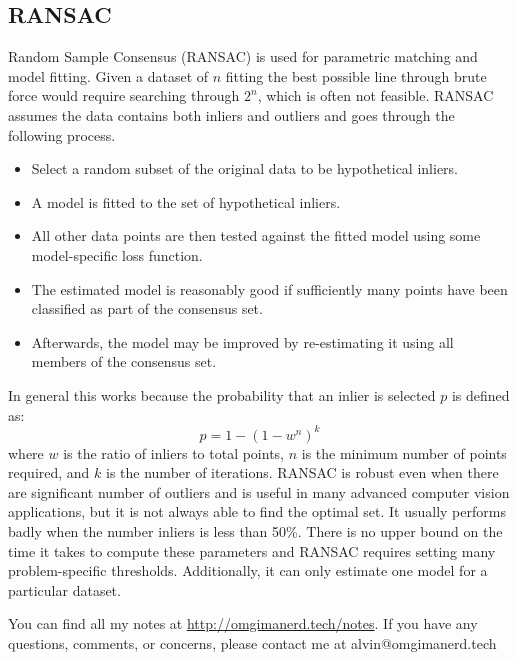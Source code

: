\documentclass{math}
\begin{document}
\subsection*{RANSAC}
Random Sample Consensus (RANSAC) is used for parametric matching and model
fitting. Given a dataset of \( n \) fitting the best possible line through
brute force would require searching through \( 2^n \), which is often not
feasible. RANSAC assumes the data contains both inliers and outliers and goes
through the following process.
\begin{itemize}
  \item Select a random subset of the original data to be hypothetical inliers.
  \item A model is fitted to the set of hypothetical inliers.
  \item All other data points are then tested against the fitted model using
    some model-specific loss function.
  \item The estimated model is reasonably good if sufficiently many points have
    been classified as part of the consensus set.
  \item Afterwards, the model may be improved by re-estimating it using all
    members of the consensus set.
\end{itemize}
In general this works because the probability that an inlier is selected \( p \)
is defined as:
\[ p = 1-(1-w^n)^k \]
where \( w \) is the ratio of inliers to total points, \( n \) is the minimum
number of points required, and \( k \) is the number of iterations. RANSAC
is robust even when there are significant number of outliers and is useful in
many advanced computer vision applications, but it is not always able to find
the optimal set. It usually performs badly when the number inliers is less than
50\%. There is no upper bound on the time it takes to compute these parameters
and RANSAC requires setting many problem-specific thresholds. Additionally, it
can only estimate one model for a particular dataset.

\begin{center}
  You can find all my notes at \url{http://omgimanerd.tech/notes}. If you have
  any questions, comments, or concerns, please contact me at
  alvin@omgimanerd.tech
\end{center}
\end{document}
